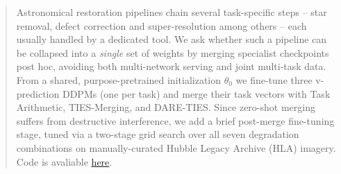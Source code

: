 \documentclass{article}
\begin{document}

\printAffiliationsAndNotice{}

\begin{abstract}
	Astronomical restoration pipelines chain several task-specific steps -- star removal, defect correction and super-resolution among others -- each usually handled by a dedicated tool. We ask whether such a pipeline can be collapsed into a \emph{single} set of weights by merging specialist checkpoints post hoc, avoiding both multi-network serving and joint multi-task data. From a shared, purpose-pretrained initialization $\theta_0$ we fine-tune three v-prediction DDPMs (one per task) and merge their task vectors with Task Arithmetic, TIES-Merging, and DARE-TIES. Since zero-shot merging suffers from destructive interference, we add a brief post-merge fine-tuning stage, tuned via a two-stage grid search over all seven degradation combinations on manually-curated Hubble Legacy Archive (HLA) imagery. Code is avaliable \href{https://github.com/aflaag/clearsky}{here}.
\end{abstract}
\end{document}
